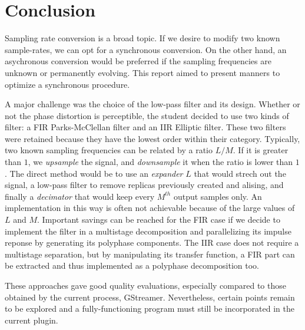 
\chapter{Conclusion} %

\label{conclusion} %

Sampling rate conversion is a broad topic. If we desire to modify two known sample-rates, we can opt for a synchronous conversion. On the other hand, an asychronous conversion would be preferred if the sampling frequencies are unknown or permanently evolving. This report aimed to present manners to optimize a synchronous procedure. 

A major challenge was the choice of the low-pass filter and its design. Whether or not the phase distortion is perceptible, the student decided to use two kinds of filter: a FIR Parks-McClellan filter and an IIR Elliptic filter. These two filters were retained because they have the lowest order within their category. Typically, two known sampling frequencies can be related by a ratio $L/M$. If it is greater than $1$, we \textit{upsample} the signal, and \textit{downsample} it when the ratio is lower than $1$. The direct method would be to use an \textit{expander} $L$ that would strech out the signal, a low-pass filter to remove replicas previously created and alising, and finally a \textit{decimator} that would keep every $M^{th}$ output samples only. An implementation in this way is often not achievable because of the large values of $L$ and $M$. Important savings can be reached for the FIR case if we decide to implement the filter in a multistage decomposition and parallelizing its impulse reponse by generating its polyphase components. The IIR case does not require a multistage separation, but by manipulating its transfer function, a FIR part can be extracted and thus implemented as a polyphase decomposition too. 

These approaches gave good quality evaluations, especially compared to those obtained by the current process, GStreamer. Nevertheless, certain points remain to be explored and a fully-functioning program must still be incorporated in the current plugin. 